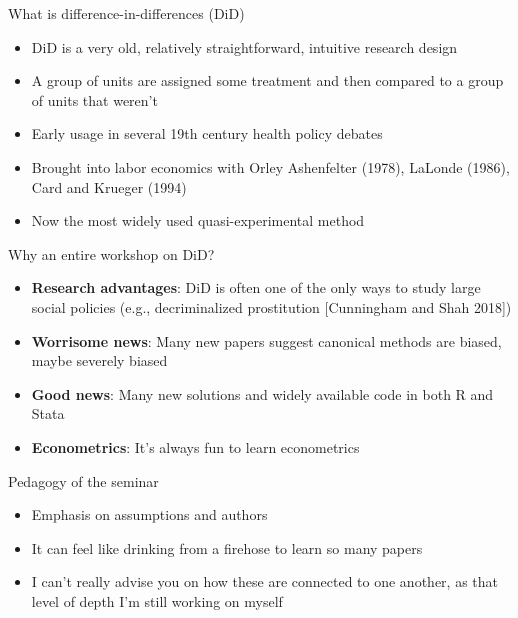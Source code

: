 \documentclass{beamer}
\begin{document}
\begin{frame}{What is difference-in-differences (DiD)}

\begin{itemize}
\item DiD is a very old, relatively straightforward, intuitive research design
\item A group of units are assigned some treatment and then compared to a group of units that weren't
\item Early usage in several 19th century health policy debates 
\item Brought into labor economics with Orley Ashenfelter (1978), LaLonde (1986), Card and Krueger (1994) 
\item Now the most widely used quasi-experimental method
\end{itemize}

\end{frame}



\begin{frame}{Why an entire workshop on DiD?}

\begin{itemize}
\item \textbf{Research advantages}: DiD is often one of the only ways to study large social policies (e.g., decriminalized prostitution [Cunningham and Shah 2018])
\item \textbf{Worrisome news}: Many new papers suggest canonical methods are biased, maybe severely biased
\item \textbf{Good news}: Many new solutions and widely available code in both R and Stata
\item \textbf{Econometrics}:  It's always fun to learn econometrics
\end{itemize}

\end{frame}

\begin{frame}{Pedagogy of the seminar}

\begin{itemize}
\item Emphasis on assumptions and authors
\item It can feel like drinking from a firehose to learn so many papers
\item I can't really advise you on how these are connected to one another, as that level of depth I'm still working on myself
\end{itemize}

\end{frame}
\end{document}
